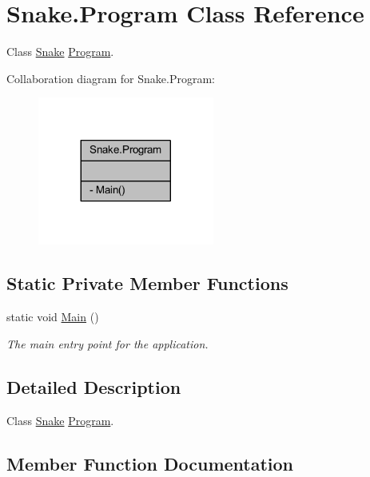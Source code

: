 \hypertarget{class_snake_1_1_program}{}\section{Snake.\+Program Class Reference}
\label{class_snake_1_1_program}


Class \mbox{\hyperlink{class_snake_1_1_snake}{Snake}} \mbox{\hyperlink{class_snake_1_1_program}{Program}}.  




Collaboration diagram for Snake.\+Program\+:
\nopagebreak
\begin{figure}[H]
\begin{center}
\leavevmode
\includegraphics[width=164pt]{d2/d59/class_snake_1_1_program__coll__graph}
\end{center}
\end{figure}
\subsection*{Static Private Member Functions}
\begin{DoxyCompactItemize}
\item 
static void \mbox{\hyperlink{class_snake_1_1_program_a95b652b4d77b5cd8f09e54d5797b89e3}{Main}} ()
\begin{DoxyCompactList}\small\item\em The main entry point for the application. \end{DoxyCompactList}\end{DoxyCompactItemize}


\subsection{Detailed Description}
Class \mbox{\hyperlink{class_snake_1_1_snake}{Snake}} \mbox{\hyperlink{class_snake_1_1_program}{Program}}. 



\subsection{Member Function Documentation}
\mbox{\label{class_snake_1_1_program_a95b652b4d77b5cd8f09e54d5797b89e3}} 
